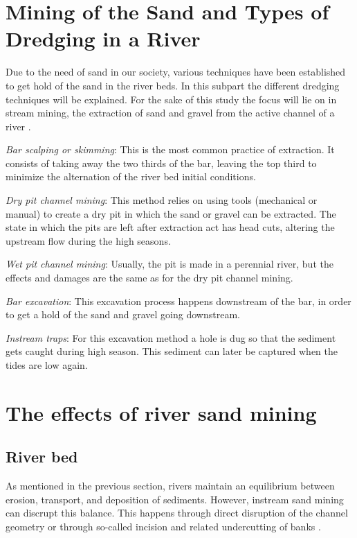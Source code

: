 \section{Mining of the Sand and Types of Dredging in a River}
Due to the need of sand in our society, various techniques have been established to get hold of the sand in the river beds. In this subpart the different dredging techniques will be explained.
For the sake of this study the focus will lie on in stream mining, the extraction of sand and gravel from the active channel of a river \autocite{sand-mining-boek}.

\textit{Bar scalping or skimming}:
This is the most common practice of extraction. It consists of taking away the two thirds of the bar, leaving the top third to minimize the alternation of the river bed initial conditions.

\textit{Dry pit channel mining}:
This method relies on using tools (mechanical or manual) to create a dry pit in which the sand or gravel can be extracted. The state in which the pits are left after extraction act has head cuts, altering the upstream flow during the high seasons.

\textit{Wet pit channel mining}:
Usually, the pit is made in a perennial river, but the effects and damages are the same as for the dry pit channel mining.

\textit{Bar excavation}:
This excavation process happens downstream of the bar, in order to get a hold of the sand and gravel going downstream.

\textit{Instream traps}:
For this excavation method a hole is dug so that the sediment gets caught during high season. This sediment can later be captured when the tides are low again.



\section{The effects of river sand mining}
\subsection{River bed}
As mentioned in the previous section, rivers maintain an equilibrium between erosion, transport, and deposition of sediments. However, instream sand mining can discrupt this balance. This happens through direct disruption of the channel geometry or through so-called incision and related undercutting of banks \autocite{sand-mining-boek}.


